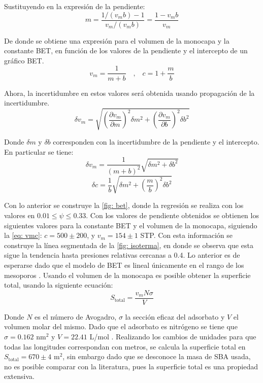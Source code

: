 \documentclass[fleqn,11pt]{SelfArx}
\begin{document}
	Sustituyendo en la expresi\'on de la pendiente:
	\begin{equation}
		m = \dfrac{1/(v_mb) - 1}{v_m/(v_mb)} = \dfrac{1-v_mb}{v_m}
	\end{equation}
	
	De donde se obtiene una expresi\'on para el volumen de la monocapa y la constante BET, en funci\'on de los valores de la pendiente y el intercepto de un gr\'afico BET.
	\begin{equation}\label{eq: vmc}
		v_m = \dfrac{1}{m+b}\quad\text{,}\quad
		c = 1 + \dfrac{m}{b}
	\end{equation}
	
	Ahora, la incertidumbre en estos valores ser\'a obtenida usando propagaci\'on de la incertidumbre.
	\begin{equation}
		\delta v_m =
		\sqrt{\left(\dfrac{\partial v_m}{\partial m}\right)^2\delta m^2 + 
		\left(\dfrac{\partial v_m}{\partial b}\right)^2\delta b^2}
	\end{equation}
	
	Donde $\delta m$ y $\delta b$ corresponden con la incertidumbre de la pendiente y el intercepto. En particular se tiene:
	\begin{equation}
		\delta v_m = \dfrac{1}{\left(m + b\right)^2}\sqrt{\delta m^2 + \delta b^2}
	\end{equation}
	\begin{equation}
		\delta c = \dfrac{1}{b}\sqrt{\delta m^2 + \left(\dfrac{m}{b}\right)^2\delta b^2}
	\end{equation}
	
	Con lo anterior se construye la \autoref{fig: bet}, donde la regresi\'on se realiza con los valores en $0.01\leq \psi \leq 0.33$. Con los valores de pendiente obtenidos se obtienen los siguientes valores para la constante BET y el volumen de la monocapa, siguiendo la \autoref{eq: vmc}: $c = 500 \pm 200$, y $v_m = 154 \pm 1$ STP. Con esta informaci\'on se construye la l\'inea segmentada de la \autoref{fig: isoterma}, en donde se observa que esta sigue la tendencia hasta presiones relativas cercanas a 0.4. Lo anterior es de esperarse dado que el modelo de BET es lineal \'unicamente en el rango de los mesoporos \cite{llewellyn2007bet}. Usando el volumen de la monocapa es posible obtener la superficie total, usando la siguiente ecuaci\'on:
	\begin{equation}
		S_{\text{total}} = \dfrac{v_mN\sigma}{V}
	\end{equation}
	\pagebreak
	
	Donde $N$ es el n\'umero de Avogadro, $\sigma$ la secci\'on eficaz del adsorbato y $V$ el volumen molar del mismo. Dado que el adsorbato es nitr\'ogeno se tiene que $\sigma = 0.162$ nm$^2$ y $V = 22.41$ L/mol \cite{ismail1992cross}. Realizando los cambios de unidades para que todas las longitudes correspondan con metros, se calcula la superficie total en $S_\text{total} = 670 \pm 4$ m$^2$, sin embargo dado que se desconoce la masa de SBA usada, no es posible comparar con la literatura, pues la superficie total es una propiedad extensiva.
	
\end{document}

